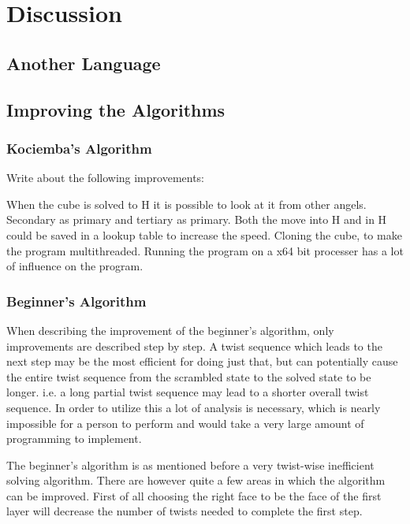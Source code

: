 \chapter{Discussion}





\section{Another Language}



\section{Improving the Algorithms}

\subsection{Kociemba's Algorithm}
Write about the following improvements:

When the cube is solved to H it is possible to look at it from other angels. Secondary as primary and tertiary as primary.
Both the move into H and in H could be saved in a lookup table to increase the speed.
Cloning the cube, to make the program multithreaded.
Running the program on a x64 bit processer has a lot of influence on the program. 

\subsection{Beginner's Algorithm}

When describing the improvement of the beginner's algorithm, only improvements are described step by step. 
A twist sequence which leads to the next step may be the most efficient for doing just that, but can potentially cause the entire twist sequence from the scrambled state to the solved state to be longer. 
i.e. a long partial twist sequence may lead to a shorter overall twist sequence. In order to utilize this a lot of analysis is necessary, which is nearly impossible for a person to perform and would take a very large amount of programming to implement.


The beginner's algorithm is as mentioned before a very twist-wise inefficient solving algorithm. 
There are however quite a few areas in which the algorithm can be improved.
First of all choosing the right face to be the face of the first layer will decrease the number of twists needed to complete the first step.




